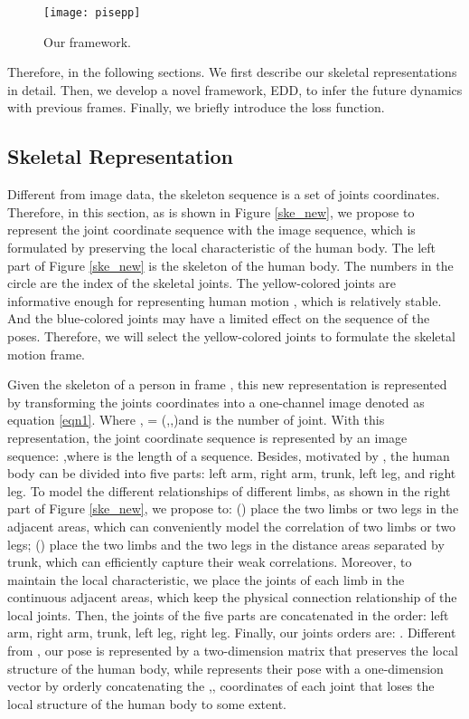 \documentclass[journal]{IEEEtran}
\begin{document}
\begin{figure}[!t]
\centering
\texttt{[image: pisepp]}
\caption{Our framework.}
\label{pisepp}
\end{figure}



Therefore, in the following sections. We first describe our skeletal representations in detail. Then, we develop a novel framework, EDD, to infer the future dynamics with previous frames. Finally, we briefly introduce the loss function.

\subsection{Skeletal Representation}
Different from image data, the skeleton sequence is a set of joints coordinates. Therefore, in this section, as is shown in Figure \ref{ske_new}, we propose to represent the joint coordinate sequence with the image sequence, which is formulated by preserving the local characteristic of the human body. The left part of Figure \ref{ske_new} is the skeleton of the human body. The numbers in the circle are the index of the skeletal joints. The yellow-colored joints are informative enough for representing human motion \cite{BIPOD}, which is relatively stable. And the blue-colored joints may have a limited effect on the sequence of the poses. Therefore, we will select the yellow-colored joints to formulate the skeletal motion frame.

Given the skeleton of a person in frame , this new representation is represented by transforming the joints coordinates  into a one-channel image  denoted as equation \ref{eqn1}. Where ,  = (,,)and  is the number of joint. With this representation, the joint coordinate sequence is represented by an image sequence: ,where  is the length of a sequence. Besides, motivated by \cite{srnnar2015,biodsf2013}, the human body can be divided into five parts: left arm, right arm, trunk, left leg, and right leg. To model the different relationships of different limbs, as shown in the right part of Figure \ref{ske_new}, we propose to: () place the two limbs or two legs in the adjacent areas, which can conveniently model the correlation of two limbs or two legs; () place the two limbs and the two legs in the distance areas separated by trunk, which can efficiently capture their weak correlations. Moreover, to maintain the local characteristic, we place the joints of each limb in the continuous adjacent areas, which keep the physical connection relationship of the local joints. Then, the joints of the five parts are concatenated in the order: left arm, right arm, trunk, left leg, right leg. Finally, our joints orders are: . Different from \cite{srnnar2015}, our pose is represented by a two-dimension matrix that preserves the local structure of the human body, while \cite{srnnar2015} represents their pose with a one-dimension vector by orderly concatenating the ,, coordinates of each joint that loses the local structure of the human body to some extent.
\end{document}
